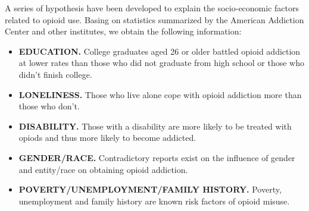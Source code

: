 A series of hypothesis have been developed to explain the socio-economic factors related to opioid use. Basing on statistics summarized by the American Addiction Center and other institutes\cite{10}\cite{11}, we obtain the following information:
\begin{itemize}
	\item \textbf{EDUCATION.} College graduates aged 26 or older battled opioid addiction at lower rates than those who did not graduate from high school or those who didn’t finish college.
	\item \textbf{LONELINESS.} Those who live alone cope with opioid addiction more than those who don't.
	\item \textbf{DISABILITY.} Those with a disability are more likely to be treated with opiods and thus more likely to become addicted.
	\item \textbf{GENDER/RACE.} Contradictory reports exist on the influence of gender and entity/race on obtaining opioid addiction. 
	\item \textbf{POVERTY/UNEMPLOYMENT/FAMILY HISTORY.} Poverty, unemployment and family history are known risk factors of opioid misuse.
\end{itemize}


\begin{comment}
he above prior knowledge imply that education, loneliness, poverty, unemployment and family addiction history are the most influential factors. Contradicting reports regarding gender and entity factors allow us to assume that they play a minor part in opioid use.

Correspondingly, in the dataset, we choose \textit{\bfseries HC03\_VC85}(low educational background), \textit{\bfseries HC03\_VC14}(Nonfamily households - Householder living alone) and \textit{\bfseries HC01\_VC103}(DISABILITY STATUS OF THE CIVILIAN NONINSTITUTIONALIZED POPULATION - Total Civilian Noninstitutionalized Population). Let them be $Y_1$, $Y_2$ and $Y_3$ Further investigation showed that \textit{\bfseries HC01\_VC103} and all other disability-relevant factors were missing and therefore removed in the data cleansing proceidure. Therefore, we attempt to obtain $\lambda$ through linear regression by fitting
\begin{equation}
\lambda = \beta_1 Y_1 + \beta_2 Y_2
\end{equation}
\subsubsection{Linear Regression}
\end{comment}



